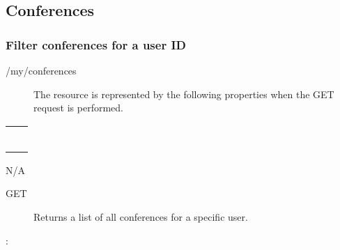 \documentclass[letterpaper,10pt,english]{sphinxmanual}
\begin{document}
\subsection{Conferences}
\label{\detokenize{restapi:conferences}}

\subsubsection{Filter conferences for a user ID}
\label{\detokenize{restapi:filter-conferences-for-a-user-id}}
 /my/conferences
\begin{description}
\item[{}] \leavevmode
The resource is represented by the following properties when the GET request is performed.

\end{description}


\begin{savenotes}\sphinxattablestart
\centering
\begin{tabulary}{\linewidth}[t]{|T|T|}
\hline

&
\\
\hline
{}
&\\
\hline
{}
&\\
\hline
{}
&\\
\hline
{}
&\\
\hline
{}
&\\
\hline
{}
&\\
\hline
\end{tabulary}
\par
\sphinxattableend\end{savenotes}

 N/A
\begin{description}
\item[{ GET}] \leavevmode
Returns a list of all conferences for a specific user.

\end{description}

:

\begin{sphinxVerbatim}[commandchars=\\\{\}]
\end{sphinxVerbatim}
\end{document}
